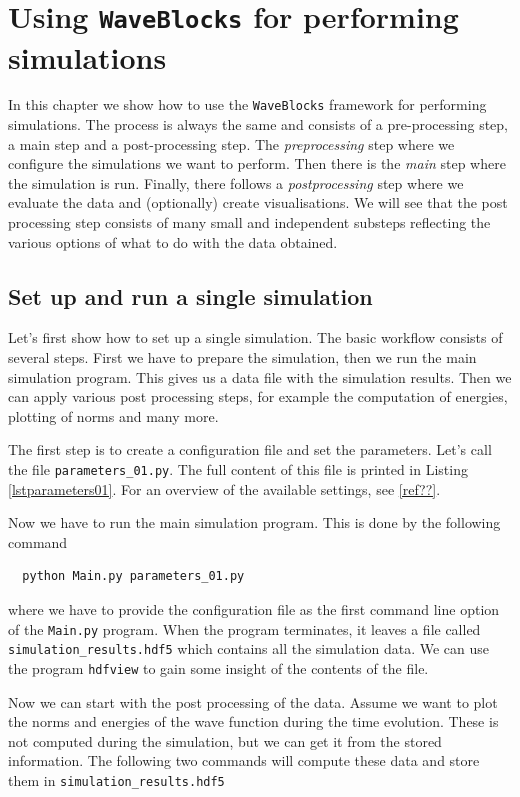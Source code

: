 \documentclass[a4paper,10pt]{report}
\begin{document}
\chapter{Using \texttt{WaveBlocks} for performing simulations}

In this chapter we show how to use the \texttt{WaveBlocks} framework for performing
simulations. The process is always the same and consists of a pre-processing step, a
main step and a post-processing step. The \emph{preprocessing} step where we configure the
simulations we want to perform. Then there is the \emph{main} step where the simulation
is run. Finally, there follows a \emph{postprocessing} step where we evaluate
the data and (optionally) create visualisations. We will see that the post processing
step consists of many small and independent substeps reflecting the various options
of what to do with the data obtained.

\section{Set up and run a single simulation}

Let's first show how to set up a single simulation. The basic workflow consists of
several steps. First we have to prepare the simulation, then we run the main simulation
program. This gives us a data file with the simulation results. Then we can apply various
post processing steps, for example the computation of energies, plotting of norms and many more.

The first step is to create a configuration file and set the parameters. Let's
call the file \texttt{parameters\_01.py}. The full content of this file is printed
in Listing \ref{lstparameters01}. For an overview of the available settings, see \ref{ref??}.

Now we have to run the main simulation program. This is done by the following command

\begin{verbatim}
  python Main.py parameters_01.py
\end{verbatim}

where we have to provide the configuration file as the first command line option
of the \texttt{Main.py} program. When the program terminates, it leaves a file
called \texttt{simulation\_results.hdf5} which contains all the simulation data.
We can use the program \texttt{hdfview} to gain some insight of the contents of the file.

Now we can start with the post processing of the data. Assume we want to plot
the norms and energies of the wave function during the time evolution. These is
not computed during the simulation, but we can get it from the stored
information. The following two commands will compute these data and store them
in \texttt{simulation\_results.hdf5}
\end{document}
